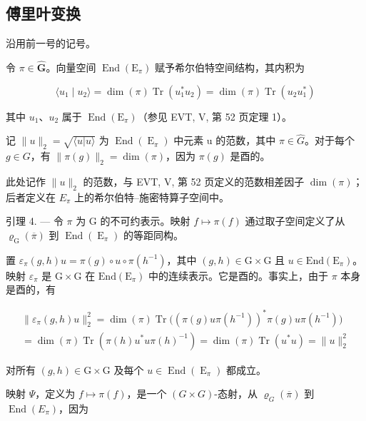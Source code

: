 \subsection{傅里叶变换}

沿用前一号的记号。

令 \(\pi \in \widehat{\mathbf{G}}\)。向量空间 \(\operatorname{End}(\mathrm{E}_{\pi})\) 赋予希尔伯特空间结构，其内积为

\[
\langle u _ {1} \mid u _ {2} \rangle = \dim (\pi) \operatorname{Tr} (u _ {1} ^ {*} u _ {2}) = \dim (\pi) \operatorname{Tr} (u _ {2} u _ {1} ^ {*})
\]

其中 \(u_{1}\)、\(u_{2}\) 属于 \(\operatorname{End}(\mathrm{E}_{\pi})\)（参见 EVT, V, 第 52 页定理 1）。

记 \(\|u\|_{2} = \sqrt{\langle u|u\rangle}\) 为 \(\operatorname{End}(\operatorname{E}_{\pi})\) 中元素 u 的范数，其中 \(\pi \in \widehat{G}\)。对于每个 \(g \in G\)，有 \(\|\pi(g)\|_{2} = \dim(\pi)\)，因为 \(\pi(g)\) 是酉的。

此处记作 \(\|u\|_{2}\) 的范数，与 EVT, V, 第 52 页定义的范数相差因子 \(\dim(\pi)\)；后者定义在 \(E_{\pi}\) 上的希尔伯特–施密特算子空间中。

引理 4. --- 令 \(\pi\) 为 G 的不可约表示。映射 \(f \mapsto \pi(f)\) 通过取子空间定义了从 \(\varrho_{\mathrm{G}}(\overline{\pi})\) 到 \(\operatorname{End}(\operatorname{E}_{\pi})\) 的等距同构。

置 \(\varepsilon_{\pi}(g,h)u = \pi(g)\circ u\circ\pi(h^{-1})\)，其中 \((g,h)\in\mathrm{G}\times\mathrm{G}\) 且 \(u\in\mathrm{End}(\mathrm{E}_{\pi})\)。映射 \(\varepsilon_{\pi}\) 是 \(\mathrm{G}\times\mathrm{G}\) 在 \(\mathrm{End}(\mathrm{E}_{\pi})\) 中的连续表示。它是酉的。事实上，由于 \(\pi\) 本身是酉的，有

\[
\begin{array}{c} \| \varepsilon_ {\pi} (g, h) u \| _ {2} ^ {2} = \dim (\pi) \operatorname{Tr} \Big ((\pi (g) u \pi (h ^ {- 1})) ^ {*} \pi (g) u \pi (h ^ {- 1}) \Big) \\ = \dim (\pi) \operatorname{Tr} (\pi (h) u ^ {*} u \pi (h) ^ {- 1}) = \dim (\pi) \operatorname{Tr} (u ^ {*} u) = \| u \| _ {2} ^ {2} \end{array}
\]

对所有 \((g,h)\in \mathrm{G}\times \mathrm{G}\) 及每个 \(u\in \operatorname {End}(\operatorname {E}_{\pi})\) 都成立。

映射 \(\Psi\)，定义为 \(f\mapsto\pi(f)\)，是一个 \((G\times G)\)-态射，从 \(\varrho_{G}(\overline{\pi})\) 到 \(\operatorname{End}(E_{\pi})\)，因为

